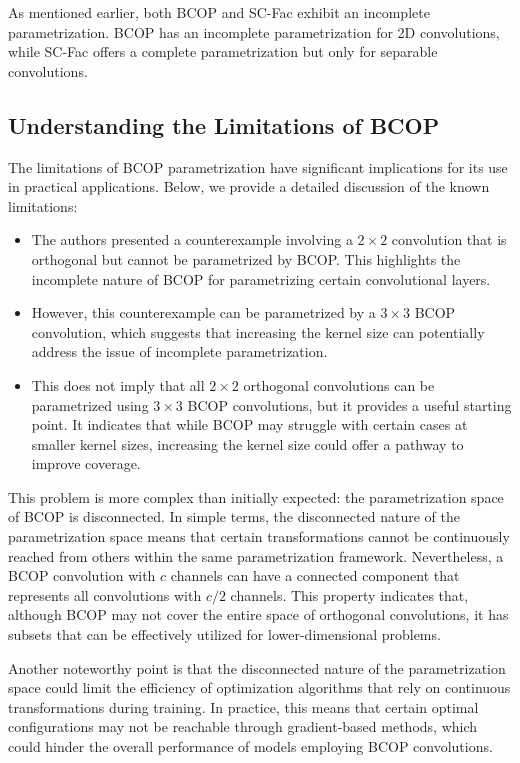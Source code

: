     As mentioned earlier, both BCOP and SC-Fac exhibit an incomplete parametrization. BCOP has an incomplete parametrization for 2D convolutions, while SC-Fac offers a complete parametrization but only for separable convolutions.
    
    \subsection{Understanding the Limitations of BCOP}
    The limitations of BCOP parametrization have significant implications for its use in practical applications. Below, we provide a detailed discussion of the known limitations:
    
    \begin{itemize}
        \item The authors presented a counterexample involving a $2\times 2$ convolution that is orthogonal but cannot be parametrized by BCOP. This highlights the incomplete nature of BCOP for parametrizing certain convolutional layers.
        \item However, this counterexample can be parametrized by a $3\times 3$ BCOP convolution, which suggests that increasing the kernel size can potentially address the issue of incomplete parametrization.
        \item This does not imply that all $2\times 2$ orthogonal convolutions can be parametrized using $3\times 3$ BCOP convolutions, but it provides a useful starting point. It indicates that while BCOP may struggle with certain cases at smaller kernel sizes, increasing the kernel size could offer a pathway to improve coverage.
    \end{itemize}
    
    This problem is more complex than initially expected: the parametrization space of BCOP is disconnected. In simple terms, the disconnected nature of the parametrization space means that certain transformations cannot be continuously reached from others within the same parametrization framework. Nevertheless, a BCOP convolution with $c$ channels can have a connected component that represents all convolutions with $c/2$ channels. This property indicates that, although BCOP may not cover the entire space of orthogonal convolutions, it has subsets that can be effectively utilized for lower-dimensional problems.
    
    Another noteworthy point is that the disconnected nature of the parametrization space could limit the efficiency of optimization algorithms that rely on continuous transformations during training. In practice, this means that certain optimal configurations may not be reachable through gradient-based methods, which could hinder the overall performance of models employing BCOP convolutions.
    

